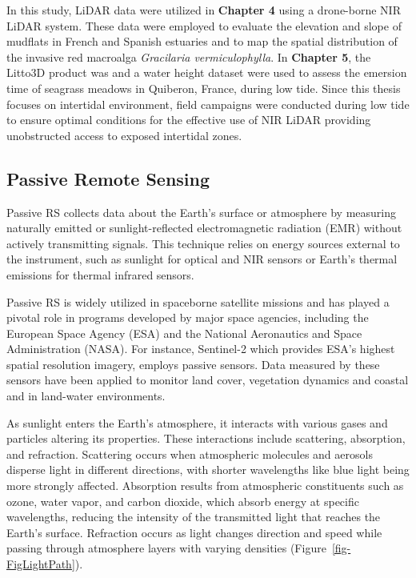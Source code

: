 \documentclass[
  letterpaper,
  11pt,
  english,
  singlespacing,
  headsepline]{MastersDoctoralThesis}
\begin{document}
\begin{spacing}{1.5}
In this study, LiDAR data were utilized in \textbf{Chapter 4} using a
drone-borne NIR LiDAR system. These data were employed to evaluate the
elevation and slope of mudflats in French and Spanish estuaries and to
map the spatial distribution of the invasive red macroalga
\emph{Gracilaria vermiculophylla}. In \textbf{Chapter 5}, the Litto3D
product was and a water height dataset were used to assess the emersion
time of seagrass meadows in Quiberon, France, during low tide. Since
this thesis focuses on intertidal environment, field campaigns were
conducted during low tide to ensure optimal conditions for the effective
use of NIR LiDAR providing unobstructed access to exposed intertidal
zones.

\subsection{Passive Remote Sensing}\label{passive-remote-sensing}

Passive RS collects data about the Earth's surface or atmosphere by
measuring naturally emitted or sunlight-reflected electromagnetic
radiation (EMR) without actively transmitting signals. This technique
relies on energy sources external to the instrument, such as sunlight
for optical and NIR sensors or Earth's thermal emissions for thermal
infrared sensors.

Passive RS is widely utilized in spaceborne satellite missions and has
played a pivotal role in programs developed by major space agencies,
including the European Space Agency (ESA) and the National Aeronautics
and Space Administration (NASA). For instance, Sentinel-2 which provides
ESA's highest spatial resolution imagery, employs passive sensors. Data
measured by these sensors have been applied to monitor land cover,
vegetation dynamics and coastal and in land-water environments.

As sunlight enters the Earth's atmosphere, it interacts with various
gases and particles altering its properties. These interactions include
scattering, absorption, and refraction. Scattering occurs when
atmospheric molecules and aerosols disperse light in different
directions, with shorter wavelengths like blue light being more strongly
affected. Absorption results from atmospheric constituents such as
ozone, water vapor, and carbon dioxide, which absorb energy at specific
wavelengths, reducing the intensity of the transmitted light that
reaches the Earth's surface. Refraction occurs as light changes
direction and speed while passing through atmosphere layers with varying
densities (Figure~\ref{fig-FigLightPath}).


\end{spacing}
\end{document}
